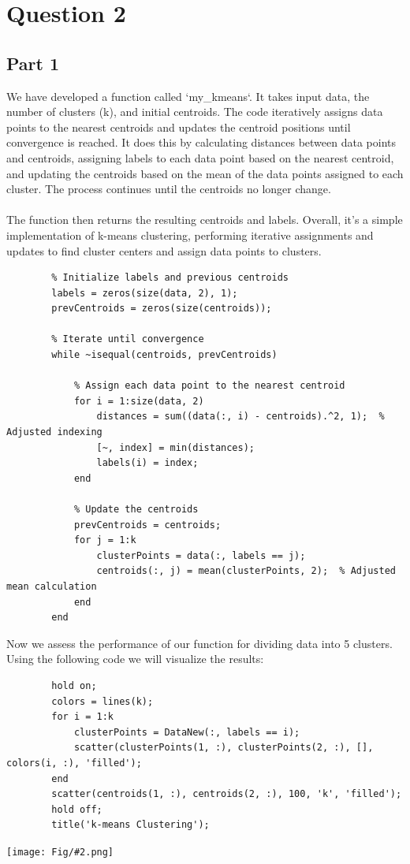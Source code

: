 \documentclass[]{article}
\newcommand{\pict}[2]{\begin{center}
		\texttt{[image: Fig/\#2.png]}
\end{center}}
\begin{document}
	\section{Question 2}
	\subsection{Part 1}
	We have developed a function called `my\_kmeans`. It takes input data, the number of clusters (k), and initial centroids. The code iteratively assigns data points to the nearest centroids and updates the centroid positions until convergence is reached. It does this by calculating distances between data points and centroids, assigning labels to each data point based on the nearest centroid, and updating the centroids based on the mean of the data points assigned to each cluster. The process continues until the centroids no longer change.\\\\
	The function then returns the resulting centroids and labels. Overall, it's a simple implementation of k-means clustering, performing iterative assignments and updates to find cluster centers and assign data points to clusters.
	\begin{lstlisting}
		% Initialize labels and previous centroids
		labels = zeros(size(data, 2), 1);
		prevCentroids = zeros(size(centroids));
		
		% Iterate until convergence
		while ~isequal(centroids, prevCentroids)
			
			% Assign each data point to the nearest centroid
			for i = 1:size(data, 2)
				distances = sum((data(:, i) - centroids).^2, 1);  % Adjusted indexing
				[~, index] = min(distances);
				labels(i) = index;
			end
			
			% Update the centroids
			prevCentroids = centroids;
			for j = 1:k
				clusterPoints = data(:, labels == j);
				centroids(:, j) = mean(clusterPoints, 2);  % Adjusted mean calculation
			end
		end
	\end{lstlisting}
	Now we assess the performance of our function for dividing data into 5 clusters. Using the following code we will visualize the results:
	\begin{lstlisting}
		hold on;
		colors = lines(k);
		for i = 1:k
			clusterPoints = DataNew(:, labels == i);
			scatter(clusterPoints(1, :), clusterPoints(2, :), [], colors(i, :), 'filled');
		end
		scatter(centroids(1, :), centroids(2, :), 100, 'k', 'filled');
		hold off;
		title('k-means Clustering');
	\end{lstlisting}
	\pict{0.6}{F10}
	
\end{document}
